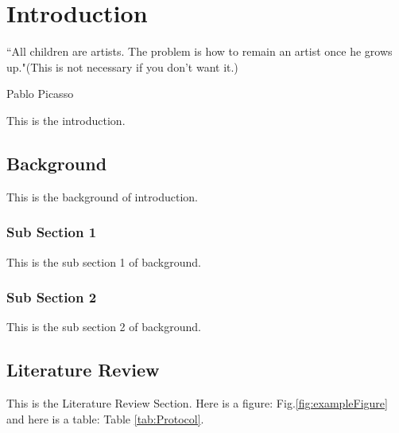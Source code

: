 \chapter{Introduction}
\label{intro} %

\epigraph{``All children are artists. The problem is how to remain an artist once he grows up."(This is not necessary if you don't want it.)}
{Pablo Picasso}

This is the introduction.

\section{Background}
\label{sec:S1}

This is the background of introduction.

\subsection{Sub Section 1}
\label{sec:SS1}

This is the sub section 1 of background.

\subsection{Sub Section 2}
\label{sec:SS2}

This is the sub section 2 of background.



\section{Literature Review}
\label{sec:InterventionRobotics}

This is the Literature Review Section. Here is a figure: Fig.\ref{fig:exampleFigure} and here is a table: Table \ref{tab:Protocol}.

